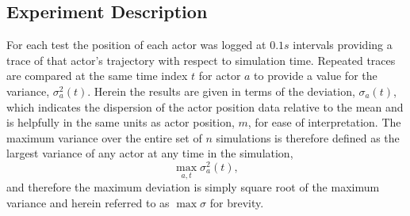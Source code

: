 \documentclass[letterpaper, 10 pt, journal, twoside]{IEEEtran}
\begin{document}

\subsection{Experiment Description}\label{s:Experiment_Description}
For each test the position of each actor was logged at $0.1s$ intervals providing a trace of that actor's trajectory with respect to simulation time. 
%
Repeated traces are compared at the same time index $t$ for actor $a$ to provide a value for the variance, $\sigma_a^{2}(t)$. 
%
Herein the results are given in terms of the deviation, $\sigma_a(t)$, which indicates the dispersion of the actor position data relative to the mean and is helpfully in the same units as actor position, $m$, for ease of interpretation.
%
The maximum variance over the entire set of $n$ simulations is therefore defined as the largest variance of any actor at any time in the simulation, 
\begin{equation} \label{eq:max_sigma}
\max_{a,t}\sigma_a^{2}(t), 
\end{equation}
and therefore the maximum deviation is simply square root of the maximum variance and herein referred to as ${\max\sigma}$ for brevity. 
\end{document}
